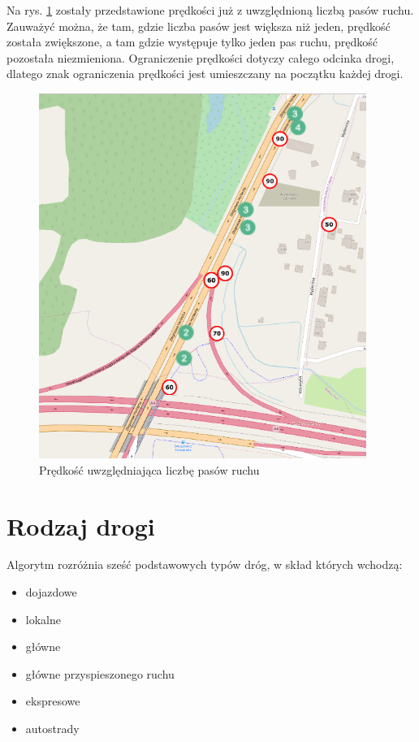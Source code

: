 \newpage
Na rys. \ref{sec:laneNumberAfter} zostały przedstawione prędkości już z uwzględnioną liczbą pasów ruchu. Zauważyć można, że tam, gdzie liczba pasów jest większa niż jeden, prędkość została zwiększone, a tam gdzie występuje tylko jeden pas ruchu, prędkość pozostała niezmieniona. Ograniczenie prędkości dotyczy całego odcinka drogi, dlatego znak ograniczenia prędkości jest umieszczany na początku każdej drogi.
\begin{figure}[h]
\caption{Prędkość uwzględniająca liczbę pasów ruchu}
\label{sec:laneNumberAfter}
\centering
\includegraphics[width=0.95\textwidth]{laneNumberAfter}
\end{figure}

\newpage
\section{Rodzaj drogi}
\label{sec:typeOfRoad}
Algorytm rozróżnia sześć podstawowych typów dróg, w skład których wchodzą:
\begin{itemize}
\item dojazdowe
\item lokalne
\item główne
\item główne przyspieszonego ruchu
\item ekspresowe
\item autostrady
\end{itemize}

